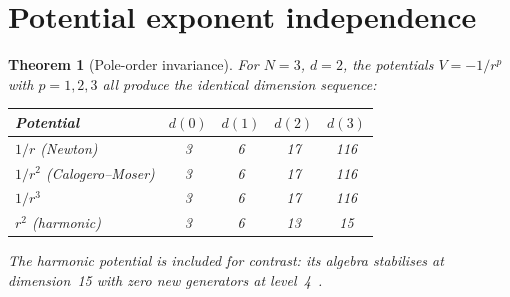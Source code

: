 \documentclass[11pt,a4paper]{article}
\newtheorem{theorem}{Theorem}
\theoremstyle{remark}
\begin{document}
\section{Potential exponent independence}
\label{sec:potential}

\begin{theorem}[Pole-order invariance]
\label{thm:pole}
For $N{=}3$, $d{=}2$, the potentials $V = -1/r^p$ with
$p = 1, 2, 3$ all produce the identical dimension
sequence:
\begin{center}
\begin{tabular}{@{}lcccc@{}}
\toprule
Potential & $d(0)$ & $d(1)$ & $d(2)$ & $d(3)$ \\
\midrule
$1/r$   (Newton)          & 3 & 6 & 17 & 116 \\
$1/r^2$ (Calogero--Moser) & 3 & 6 & 17 & 116 \\
$1/r^3$                   & 3 & 6 & 17 & 116 \\
\midrule
$r^2$ (harmonic)          & 3 & 6 & 13 & 15 \\
\bottomrule
\end{tabular}
\end{center}
The harmonic potential is included for contrast: its
algebra stabilises at dimension~15 with zero new
generators at level~4~\cite{paper1}.
\end{theorem}
\end{document}
